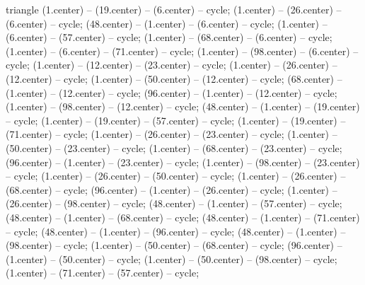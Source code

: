 \begin{pgfonlayer}{triangle} 
 (1.center) -- (19.center) -- (6.center) -- cycle; 
 (1.center) -- (26.center) -- (6.center) -- cycle; 
 (48.center) -- (1.center) -- (6.center) -- cycle; 
 (1.center) -- (6.center) -- (57.center) -- cycle; 
 (1.center) -- (68.center) -- (6.center) -- cycle; 
 (1.center) -- (6.center) -- (71.center) -- cycle; 
 (1.center) -- (98.center) -- (6.center) -- cycle; 
 (1.center) -- (12.center) -- (23.center) -- cycle; 
 (1.center) -- (26.center) -- (12.center) -- cycle; 
 (1.center) -- (50.center) -- (12.center) -- cycle; 
 (68.center) -- (1.center) -- (12.center) -- cycle; 
 (96.center) -- (1.center) -- (12.center) -- cycle; 
 (1.center) -- (98.center) -- (12.center) -- cycle; 
 (48.center) -- (1.center) -- (19.center) -- cycle; 
 (1.center) -- (19.center) -- (57.center) -- cycle; 
 (1.center) -- (19.center) -- (71.center) -- cycle; 
 (1.center) -- (26.center) -- (23.center) -- cycle; 
 (1.center) -- (50.center) -- (23.center) -- cycle; 
 (1.center) -- (68.center) -- (23.center) -- cycle; 
 (96.center) -- (1.center) -- (23.center) -- cycle; 
 (1.center) -- (98.center) -- (23.center) -- cycle; 
 (1.center) -- (26.center) -- (50.center) -- cycle; 
 (1.center) -- (26.center) -- (68.center) -- cycle; 
 (96.center) -- (1.center) -- (26.center) -- cycle; 
 (1.center) -- (26.center) -- (98.center) -- cycle; 
 (48.center) -- (1.center) -- (57.center) -- cycle; 
 (48.center) -- (1.center) -- (68.center) -- cycle; 
 (48.center) -- (1.center) -- (71.center) -- cycle; 
 (48.center) -- (1.center) -- (96.center) -- cycle; 
 (48.center) -- (1.center) -- (98.center) -- cycle; 
 (1.center) -- (50.center) -- (68.center) -- cycle; 
 (96.center) -- (1.center) -- (50.center) -- cycle; 
 (1.center) -- (50.center) -- (98.center) -- cycle; 
 (1.center) -- (71.center) -- (57.center) -- cycle; 

\end{pgfonlayer}
